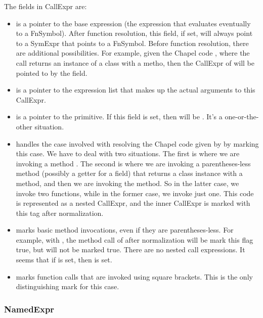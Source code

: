 \documentclass[10pt]{article}
\begin{document}
The fields in CallExpr are:
\begin{itemize}
\item {} is a pointer to the base expression (the
  expression that evaluates eventually to a FnSymbol).  After function
  resolution, this field, if set, will always point to a SymExpr that
  points to a FnSymbol.  Before function resolution, there are
  additional possibilities.  For example, given the Chapel code
  , where the call  returns an instance of a
  class with a  metho, then the CallExpr of  will
  be pointed to by the  field.
\item {} is a pointer to the expression list that
  makes up the actual arguments to this CallExpr.
\item {} is a pointer to the primitive.  If
  this field is set, then  will be .  It's a
  one-or-the-other situation.
\item {} handles the case involved with resolving
  the Chapel code given by  by marking this case.  We have
  to deal with two situations.  The first is where we are invoking a
  method .  The second is where we are invoking a
  parentheses-less method (possibly a getter for a field) that returns
  a class instance with a  method, and then we are invoking
  the  method.  So in the latter case, we invoke two
  functions, while in the former case, we invoke just one.  This code
  is represented as a nested CallExpr, and the inner CallExpr is
  marked with this tag after normalization.
\item {} marks basic method invocations, even if they
  are parentheses-less.  For example, with , the method call
  of  after normalization will be mark this flag true, but
   will not be marked true.  There are no nested call
  expressions.  It seems that if  is set, then
   is set.
\item {} marks function calls that are invoked using
  square brackets.  This is the only distinguishing mark for this
  case.
\end{itemize}

\subsubsection{NamedExpr}
\label{sec:namedexpr}
\end{document}
